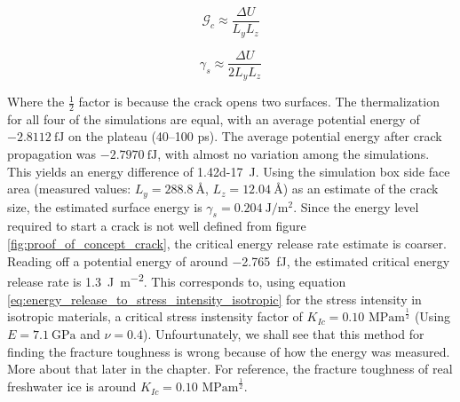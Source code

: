 \begin{equation}
	\mathcal{G}_c \approx \frac{\Delta U}{L_yL_z}
\end{equation}

\begin{equation}
	\gamma_s \approx \frac{\Delta U}{2 L_y L_z}
\end{equation}

Where the $\frac{1}{2}$ factor is because the crack opens two surfaces. The thermalization for all four of the simulations are equal, with an average potential energy of $\SI{-2.8112}{\femto\joule}$ on the plateau (40--100 \si{\pico\second}). The average potential energy after crack propagation was $\SI{-2.7970}{\femto\joule}$, with almost no variation among the simulations. This yields an energy difference of \SI{1.42d-17}{\joule}. Using the simulation box side face area (measured values: $L_y = \SI{288.8}{\angstrom}$, $L_z = \SI{12.04}{\angstrom}$) as an estimate of the crack size, the estimated surface energy is $\gamma_s = \SI{0.204}{\joule\per\meter\squared}$. Since the energy level required to start a crack is not well defined from figure \ref{fig:proof_of_concept_crack}, the critical energy release rate estimate is coarser. Reading off a potential energy of around \SI{-2.765}{\femto\joule}, the estimated critical energy release rate is \SI{1.3}{\joule\per\meter\squared}. This corresponds to, using equation \ref{eq:energy_release_to_stress_intensity_isotropic} for the stress intensity in isotropic materials, a critical stress instensity factor of $K_{Ic} = 0.10 \text{ MPam}^{\frac{1}{2}}$ (Using $E=\SI{7.1}{\giga\pascal}$ and $\nu = 0.4$). Unfourtunately, we shall see that this method for finding the fracture toughness is wrong because of how the energy was measured. More about that later in the chapter. For reference, the fracture toughness of real freshwater ice is around $K_{Ic} = 0.10 \text{ MPam}^{\frac{1}{2}}$. 

